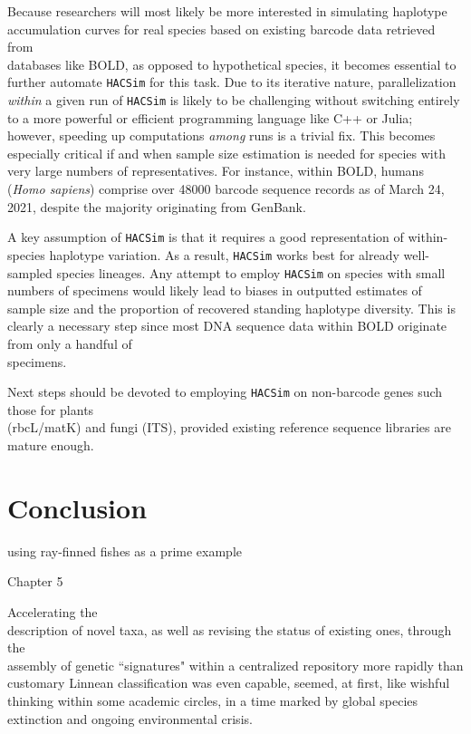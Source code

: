 Because researchers will most likely be more interested in simulating haplotype \\ accumulation curves for real species based on existing barcode data retrieved from \\ databases like BOLD, as opposed to hypothetical species, it becomes essential to further automate {\tt HACSim} for this task. Due to its iterative nature, parallelization \textit{within} a given run of {\tt HACSim} is likely to be challenging without switching entirely to a more powerful or efficient programming language like C++ or Julia; however, speeding up computations \textit{among} runs is a trivial fix. This becomes especially critical if and when sample size estimation is needed for species with very large numbers of representatives. For instance, within BOLD, humans (\textit{Homo sapiens}) comprise over 48000 barcode sequence records as of March 24, 2021, despite the majority originating from GenBank. 

A key assumption of {\tt HACSim} is that it requires a good representation of within-species haplotype variation. As a result, {\tt HACSim} works best for already well-sampled species lineages. Any attempt to employ {\tt HACSim} on species with small numbers of specimens would likely lead to biases in outputted estimates of sample size and the proportion of recovered standing haplotype diversity.  This is clearly a necessary step since most DNA sequence data within BOLD originate from only a handful of \\ specimens.


Next steps should be devoted to employing {\tt HACSim} on non-barcode genes such those for plants \\ (rbcL/matK) and fungi (ITS), provided existing reference sequence libraries are mature enough.

\section{Conclusion}

using ray-finned fishes as a prime example


Chapter 5


Accelerating the \\ description of novel taxa, as well as revising the status of existing ones, through the \\ assembly of genetic ``signatures" within a centralized repository more rapidly than \\ customary Linnean classification was even capable, seemed, at first, like wishful thinking within some academic circles, in a time marked by global species extinction and ongoing environmental crisis. 

